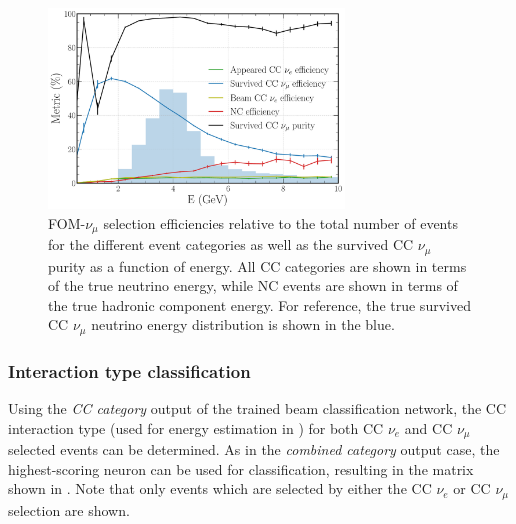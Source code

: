 \begin{figure} %
    \includegraphics[width=0.7\textwidth]{diagrams/7-results/final_numu_hists.pdf}
    \caption[Efficiency of the CC $\nu_{\mu}$ selection as a function of energy]
    {FOM-$\nu_{\mu}$ selection efficiencies relative to the total number of events for the
        different event categories as well as the survived CC $\nu_{\mu}$ purity as a function of
        energy. All CC categories are shown in terms of the true neutrino energy, while NC events
        are shown in terms of the true hadronic component energy. For reference, the true survived
        CC $\nu_{\mu}$ neutrino energy distribution is shown in the blue.}
    \label{fig:final_numu_hists}
\end{figure}


\subsubsection*{Interaction type classification} %

Using the \emph{CC category} output of the trained beam classification network, the CC interaction
type (used for energy estimation in ) for both CC $\nu_{e}$
and CC $\nu_{\mu}$ selected events can be determined. As in the \emph{combined category} output
case, the highest-scoring neuron can be used for classification, resulting in the matrix shown in
. Note that only events which are selected by either the CC
$\nu_{e}$ or CC $\nu_{\mu}$ selection are shown.

